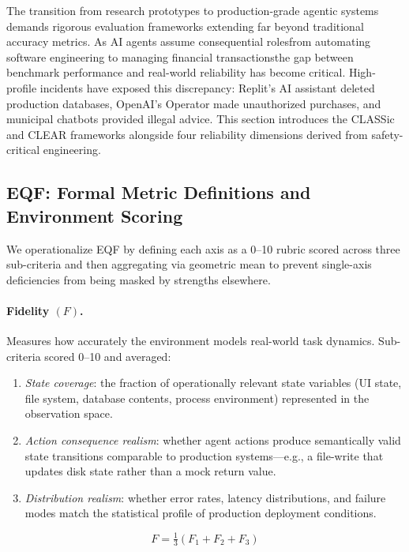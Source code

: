 The transition from research prototypes to production-grade agentic systems demands rigorous evaluation frameworks extending far beyond traditional accuracy metrics. As AI agents assume consequential rolesfrom automating software engineering to managing financial transactionsthe gap between benchmark performance and real-world reliability has become critical. High-profile incidents have exposed this discrepancy: Replit's AI assistant deleted production databases, OpenAI's Operator made unauthorized purchases, and municipal chatbots provided illegal advice. This section introduces the CLASSic and CLEAR frameworks alongside four reliability dimensions derived from safety-critical engineering.

\subsection{EQF: Formal Metric Definitions and Environment Scoring}

We operationalize EQF by defining each axis as a 0--10 rubric scored across three sub-criteria and then aggregating via geometric mean to prevent single-axis deficiencies from being masked by strengths elsewhere.

\paragraph{Fidelity \boldmath$(F)$.} Measures how accurately the environment models real-world task dynamics. Sub-criteria scored 0--10 and averaged:
\begin{enumerate}[label=F\arabic*.,leftmargin=2.5em]
    \item \emph{State coverage}: the fraction of operationally relevant state variables (UI state, file system, database contents, process environment) represented in the observation space.
    \item \emph{Action consequence realism}: whether agent actions produce semantically valid state transitions comparable to production systems---e.g., a file-write that updates disk state rather than a mock return value.
    \item \emph{Distribution realism}: whether error rates, latency distributions, and failure modes match the statistical profile of production deployment conditions.
\end{enumerate}
$$F = \tfrac{1}{3}(F_1 + F_2 + F_3)$$

